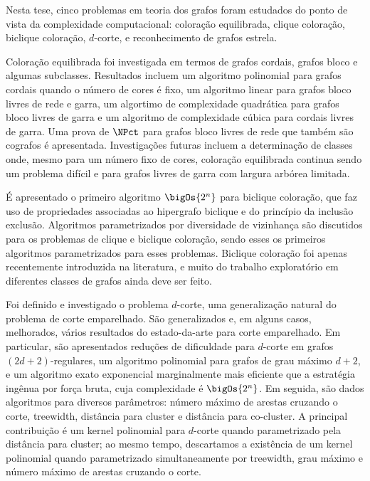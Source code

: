 Nesta tese, cinco problemas em teoria dos grafos foram estudados do ponto de vista da complexidade computacional: coloração equilibrada, clique coloração, biclique coloração, $d$-corte, e reconhecimento de grafos estrela.

Coloração equilibrada foi investigada em termos de grafos cordais, grafos bloco e algumas subclasses.
Resultados incluem um algoritmo polinomial para grafos cordais quando o número de cores é fixo, um algoritmo linear para grafos bloco livres de rede e garra, um algortimo de complexidade quadrática para grafos bloco livres de garra e um algoritmo de complexidade cúbica para cordais livres de garra.
Uma prova de $\NPct$ para grafos bloco livres de rede que também são cografos é apresentada.
Investigações futuras incluem a determinação de classes onde, mesmo para um número fixo de cores, coloração equilibrada continua sendo um problema difícil e para grafos livres de garra com largura arbórea limitada.

É apresentado o primeiro algoritmo $\bigOs{2^n}$ para biclique coloração, que faz uso de propriedades associadas ao hipergrafo biclique e do princípio da inclusão exclusão.
Algoritmos parametrizados por diversidade de vizinhança são discutidos para os problemas de clique e biclique coloração, sendo esses os primeiros algoritmos parametrizados para esses problemas.
Biclique coloração foi apenas recentemente introduzida na literatura, e muito do trabalho exploratório em diferentes classes de grafos ainda deve ser feito.

Foi definido e investigado o problema $d$-corte, uma generalização natural do problema de corte emparelhado.
São generalizados e, em alguns casos, melhorados, vários resultados do estado-da-arte para corte emparelhado.
Em particular, são apresentados reduções de \NP dificuldade para $d$-corte em grafos $(2d+2)$-regulares, um algoritmo polinomial para grafos de grau máximo $d + 2$, e um algoritmo exato exponencial marginalmente mais eficiente que a estratégia ingênua por força bruta, cuja complexidade é $\bigOs{2^n}$.
Em seguida, são dados algoritmos \FPT para diversos parâmetros: número máximo de arestas cruzando o corte, treewidth, distância para cluster e distância para co-cluster.
A principal contribuição é um kernel polinomial para $d$-corte quando parametrizado pela distância para cluster; ao mesmo tempo, descartamos a existência de um kernel polinomial quando parametrizado simultaneamente por treewidth, grau máximo e número máximo de arestas cruzando o corte.

